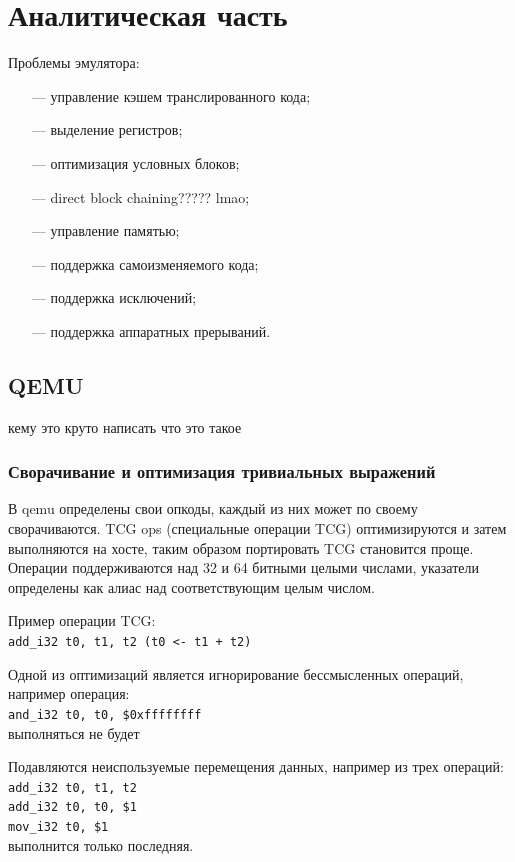 \section{Аналитическая часть}

Проблемы эмулятора:
\begin{itemize}[leftmargin=1.6\parindent]
	\item[---] управление кэшем транслированного кода;
	\item[---] выделение регистров;
	\item[---] оптимизация условных блоков;
	\item[---] direct block chaining????? lmao;
	\item[---] управление памятью;
	\item[---] поддержка самоизменяемого кода;
	\item[---] поддержка исключений;
	\item[---] поддержка аппаратных прерываний.
\end{itemize}

\subsection{QEMU}

кему это круто написать что это такое

\subsubsection{Сворачивание и оптимизация тривиальных выражений}

В qemu определены свои опкоды, каждый из них может по своему сворачиваются. TCG ops (специальные операции TCG) оптимизируются и затем выполняются на хосте, таким образом портировать TCG становится проще. Операции поддерживаются над 32 и 64 битными целыми числами, указатели определены как алиас над соответствующим целым числом.

Пример операции TCG:\\
\texttt{add\_i32 t0, t1, t2  (t0 <- t1 + t2)}

Одной из оптимизаций является игнорирование бессмысленных операций, например операция:\\
\texttt{and\_i32 t0, t0, \$0xffffffff\\}
выполняться не будет

Подавляются неиспользуемые перемещения данных, например из трех операций:\\
\texttt{add\_i32 t0, t1, t2\\
add\_i32 t0, t0, \$1\\
mov\_i32 t0, \$1\\}
выполнится только последняя.

